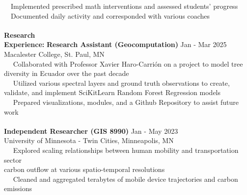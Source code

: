 \documentclass[letterpaper,12pt]{article}
\numberwithin{equation}{section}
\begin{document}
\hspace*{1.2in} \textbullet ~~Implemented prescribed math interventions and assessed students' progress\\
\hspace*{1.2in} \textbullet ~~Documented daily activity and corresponded with various coaches\\
\\
\noindent\textbf{Research}\\
\noindent\textbf{Experience:}\hspace*{.16in}\textbf{ Research Assistant (Geocomputation)} \hspace*{2.in} Jan - Mar 2025\\
\hspace*{1.16in} Macalester College, St. Paul, MN \vspace*{.1cm}\\
\hspace*{1.2in} \textbullet ~~ Collaborated with Professor Xavier Haro-Carri\'on on a project to model tree diversity 
\hspace*{1.6in} in Ecuador over the past decade\\
\hspace*{1.2in} \textbullet ~~ Utilized various spectral layers and ground truth observations to create, validate, and 
\hspace*{1.6in} implement SciKitLearn Random Forest Regression models\\
\hspace*{1.2in} \textbullet ~~ Prepared visualizations, modules, and a Github Repository to assist future work
\\\\
\hspace*{1.16in} \textbf{Independent Researcher (GIS 8990)} \hspace*{2.2in} Jan - May 2023\\
\hspace*{1.16in} University of Minnesota - Twin Cities, Minneapolis, MN \vspace*{.1cm}\\
\hspace*{1.2in} \textbullet ~~ Explored scaling relationships between human mobility and transportation sector \\
\hspace*{1.6in} carbon outflow at various spatio-temporal resolutions\\
\hspace*{1.2in} \textbullet ~~ Cleaned and aggregated terabytes of mobile device trajectories and carbon emissions\\
\end{document}
